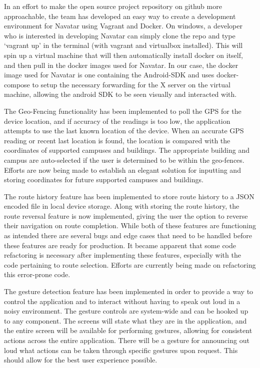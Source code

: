 \documentclass{scrreprt}
\begin{document}
	In an effort to make the open source project repository on github more approachable, the team has developed an easy way to create a development environment for Navatar using Vagrant and Docker. On windows, a developer who is interested in developing Navatar can simply clone the repo and type ‘vagrant up’ in the terminal (with vagrant and virtualbox installed). This will spin up a virtual machine that will then automatically install docker on itself, and then pull in the docker images used for Navatar. In our case, the docker image used for Navatar is one containing the Android-SDK and uses docker-compose to setup the necessary forwarding for the X server on the virtual machine, allowing the android SDK to be seen visually and interacted with.
	
    The Geo-Fencing functionality has been implemented to poll the GPS for the device location, and if accuracy of the readings is too low, the application attempts to use the last known location of the device. When an accurate GPS reading or recent last location is found, the location is compared with the coordinates of supported campuses and buildings. The appropriate building and campus are auto-selected if the user is determined to be within the geo-fences. Efforts are now being made to establish an elegant solution for inputting and storing coordinates for future supported campuses and buildings.
    
	The route history feature has been implemented to store route history to a JSON encoded file in local device storage. Along with storing the route history, the route reversal feature is now implemented, giving the user the option to reverse their navigation on route completion. While both of these features are functioning as intended there are several bugs and edge cases that need to be handled before these features are ready for production. It became apparent that some code refactoring is necessary after implementing these features, especially with the code pertaining to route selection. Efforts are currently being made on refactoring this error-prone code.

\pagebreak

	The gesture detection feature has been implemented in order to provide a way to control the application and to interact without having to speak out loud in a noisy environment. The gesture controls are system-wide and can be hooked up to any component. The screens will state what they are in the application, and the entire screen will be available for performing gestures, allowing for consistent actions across the entire application. There will be a gesture for announcing out loud what actions can be taken through specific gestures upon request. This should allow for the best user experience possible.
\end{document}
